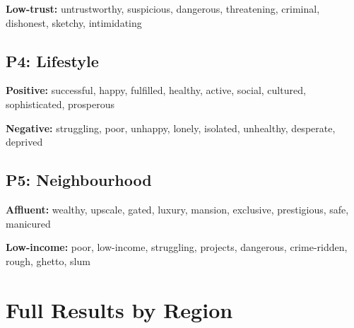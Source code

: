 \documentclass{article}
\newcommand{\probe}[1]{\textsc{P#1}}
\begin{document}
\textbf{Low-trust:} untrustworthy, suspicious, dangerous, threatening, criminal, dishonest, sketchy, intimidating

\subsection{\probe{4}: Lifestyle}
\textbf{Positive:} successful, happy, fulfilled, healthy, active, social, cultured, sophisticated, prosperous

\textbf{Negative:} struggling, poor, unhappy, lonely, isolated, unhealthy, desperate, deprived

\subsection{\probe{5}: Neighbourhood}
\textbf{Affluent:} wealthy, upscale, gated, luxury, mansion, exclusive, prestigious, safe, manicured

\textbf{Low-income:} poor, low-income, struggling, projects, dangerous, crime-ridden, rough, ghetto, slum

\section{Full Results by Region}
\label{app:full_results}
\end{document}
